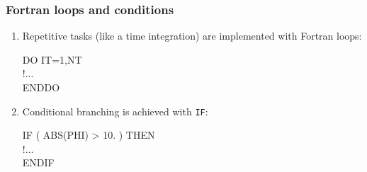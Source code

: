 \documentclass[aspectratio=43,9pt]{beamer}
\begin{document}
\begin{frame}
	\frametitle{Fortran loops and conditions}
	\begin{enumerate}	
		\item Repetitive tasks (like a time integration) are implemented with Fortran loops:
			\par\vspace*{1ex}\hspace*{.05\textwidth}\parbox{.8\textwidth}{\ttfamily\small
				\textcolor{green!80!black}{DO} IT=1,NT\\
				\hspace*{2em}!...\\
				\textcolor{green!80!black}{ENDDO}
			}\vspace*{1ex}\par
		\item Conditional branching is achieved with \texttt{IF}:
			\par\vspace*{1ex}\hspace*{.05\textwidth}\parbox{.8\textwidth}{\ttfamily\small
				\textcolor{green!80!black}{IF} ( ABS(PHI) > 10. ) \textcolor{green!80!black}{THEN}\\
				\hspace*{2em}!...\\
				\textcolor{green!80!black}{ENDIF}
			}\vspace*{1ex}\par
	\end{enumerate}
\end{frame}
%
%
\end{document}
